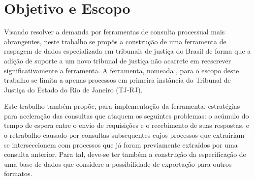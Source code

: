 \section{Objetivo e Escopo}

Visando resolver a demanda por ferramentas de consulta processual mais
abrangentes, neste trabalho se propôs a construção de uma ferramenta de
raspagem de dados especializada em tribunais de justiça do Brasil de forma que
a adição de suporte a um novo tribunal de justiça não acarrete em reescrever
significativamente a ferramenta. A ferramenta, nomeada \textbf{\tjscraper},
para o escopo deste trabalho se limita a apenas processos em primeira
instância do Tribunal de Justiça do Estado do Rio de Janeiro (TJ-RJ).

Este trabalho também propõe, para implementação da ferramenta, estratégias para
aceleração das consultas que ataquem os seguintes problemas: o acúmulo do tempo
de espera entre o envio de requisições e o recebimento de suas respostas, e o
retrabalho causado por consultas subsequentes cujos processos que extrairiam se
interseccionem com processos que já foram previamente extraídos por uma
consulta anterior. Para tal, deve-se ter também a construção da especificação
de uma base de dados que considere a possibilidade de exportação para outros
formatos.
